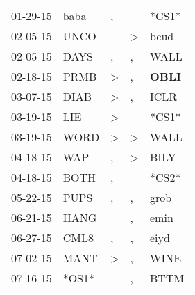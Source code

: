 \begin{supertabular}{p{0.07\textwidth}p{0.06\textwidth}p{0.02\textwidth}p{0.02\textwidth}p{0.06\textwidth}}
          01-29-15\textsuperscript{} &           baba\textsuperscript{} &                , &                  &                            *CS1* \\
          02-05-15\textsuperscript{} &           UNCO\textsuperscript{} &                  &     \textgreater &           bcud\textsuperscript{} \\
          02-05-15\textsuperscript{} &           DAYS\textsuperscript{} &                , &                , &           WALL\textsuperscript{} \\
          02-18-15\textsuperscript{} &           PRMB\textsuperscript{} &     \textgreater &                , &  \textbf{OBLI\textsuperscript{}} \\
          03-07-15\textsuperscript{} &           DIAB\textsuperscript{} &     \textgreater &                , &           ICLR\textsuperscript{} \\
          03-19-15\textsuperscript{} &            LIE\textsuperscript{} &     \textgreater &                  &                            *CS1* \\
          03-19-15\textsuperscript{} &           WORD\textsuperscript{} &     \textgreater &     \textgreater &           WALL\textsuperscript{} \\
          04-18-15\textsuperscript{} &            WAP\textsuperscript{} &                , &     \textgreater &           BILY\textsuperscript{} \\
          04-18-15\textsuperscript{} &           BOTH\textsuperscript{} &                , &                  &                            *CS2* \\
          05-22-15\textsuperscript{} &           PUPS\textsuperscript{} &                , &                , &           grob\textsuperscript{} \\
          06-21-15\textsuperscript{} &           HANG\textsuperscript{} &                  &                , &           emin\textsuperscript{} \\
          06-27-15\textsuperscript{} &           CML8\textsuperscript{} &                , &                , &           eiyd\textsuperscript{} \\
          07-02-15\textsuperscript{} &           MANT\textsuperscript{} &     \textgreater &                , &           WINE\textsuperscript{} \\
          07-16-15\textsuperscript{} &                            *OS1* &                  &                , &           BTTM\textsuperscript{} \\

\end{supertabular}
